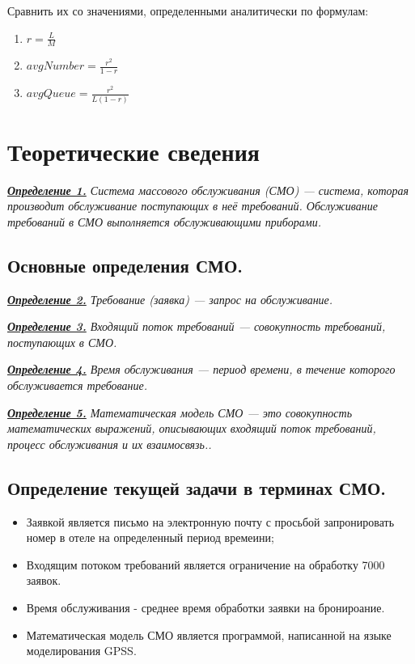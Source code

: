 \documentclass[a4paper, 12pt]{article}   	%
\begin{document}
    Сравнить их со значениями, определенными аналитически по формулам:
    \begin{enumerate}
        \item $r = \frac{L}{M}$
        \item $avgNumber = \frac{r^2}{1 - r}$
        \item $avgQueue = \frac{r^2}{L(1-r)}$
    \end{enumerate}

\newpage

\section{Теоретические сведения}
    \textit{\textbf{\underline{Определение 1.}} Система массового обслуживания (СМО) — система, которая производит обслуживание поступающих в неё требований. Обслуживание требований в СМО выполняется обслуживающими приборами. }
    
    \subsection{Основные определения СМО.}
    
        \textit{\textbf{\underline{Определение 2.}} Требование (заявка) — запрос на обслуживание. }
        
        \noindent\textit{\textbf{\underline{Определение 3.}} Входящий поток требований — совокупность требований, поступающих в СМО. }
        
        \noindent\textit{\textbf{\underline{Определение 4.}} Время обслуживания — период времени, в течение которого обслуживается требование. }
        
        \noindent\textit{\textbf{\underline{Определение 5.}} Математическая модель СМО — это совокупность математических выражений, описывающих входящий поток требований, процесс обслуживания и их взаимосвязь.. }
    
    \subsection{Определение текущей задачи в терминах СМО.}
        \begin{itemize}
            \item Заявкой является письмо на электронную почту с просьбой запронировать номер в отеле на определенный период времеини;
            \item Входящим потоком требований является ограничение на обработку 7000 заявок.
            \item Время обслуживания - среднее время обработки заявки на бронироание.
            \item Математическая модель СМО является программой, написанной на языке моделирования GPSS.
        \end{itemize}
    
\end{document}
